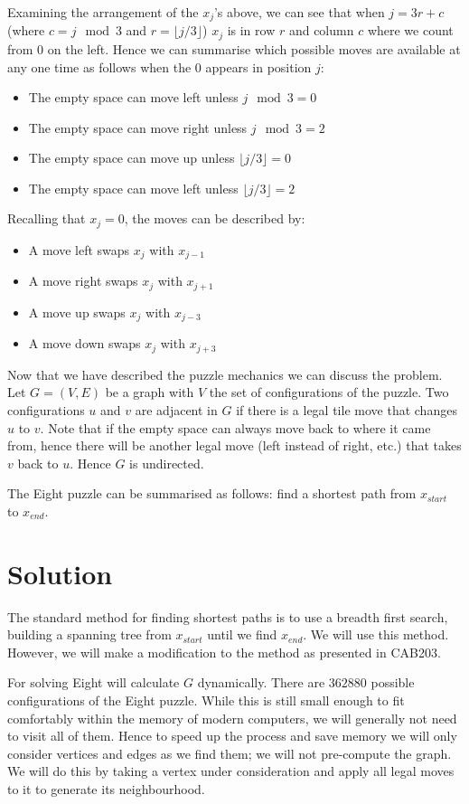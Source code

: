 \documentclass[a4paper]{article}
\begin{document}
Examining the arrangement of the $x_j$'s above, we can see that when $j = 3r + c$ (where $c = j \mod 3$ and $r = \lfloor j / 3\rfloor$) $x_j$ is in row $r$ and column $c$ where we count from 0 on the left.  Hence we can summarise which possible moves are available at any one time as follows when the 0 appears in position $j$:
\begin{itemize}
   \item The empty space can move left unless $j \mod 3 = 0$
   \item The empty space can move right unless $j \mod 3 = 2$
   \item The empty space can move up unless $\lfloor j/3 \rfloor = 0$
   \item The empty space can move left unless $\lfloor j/3 \rfloor = 2$
\end{itemize}
Recalling that $x_j = 0$, the moves can be described by:
\begin{itemize}
   \item A move left swaps $x_j$ with $x_{j - 1}$
   \item A move right swaps $x_j$ with $x_{j + 1}$
   \item A move up swaps $x_j$ with $x_{j - 3}$
   \item A move down swaps $x_j$ with $x_{j + 3}$
\end{itemize}

Now that we have described the puzzle mechanics we can discuss the problem.  Let $G = (V,E)$ be a graph with $V$ the set of configurations of the puzzle.  Two configurations $u$ and $v$ are adjacent in $G$ if there is a legal tile move that changes $u$ to $v$.  Note that if the empty space can always move back to where it came from, hence there will be another legal move (left instead of right, etc.) that takes $v$ back to $u$.  Hence $G$ is undirected.

The Eight puzzle can be summarised as follows: find a shortest path from $x_{start}$ to $x_{end}$.
\section{Solution}\label{sec:solution}
The standard method for finding shortest paths is to use a breadth first search, building a spanning tree from $x_{start}$ until we find $x_{end}$.  We will use this method.  However, we will make a modification to the method as presented in CAB203.  

For solving Eight will calculate $G$ dynamically.  There are $362880$ possible configurations of the Eight puzzle.  While this is still small enough to fit comfortably within the memory of modern computers, we will generally not need to visit all of them.  Hence to speed up the process and save memory we will only consider vertices and edges as we find them; we will not pre-compute the graph.  We will do this by taking a vertex under consideration and apply all legal moves to it to generate its neighbourhood.    
\end{document}
